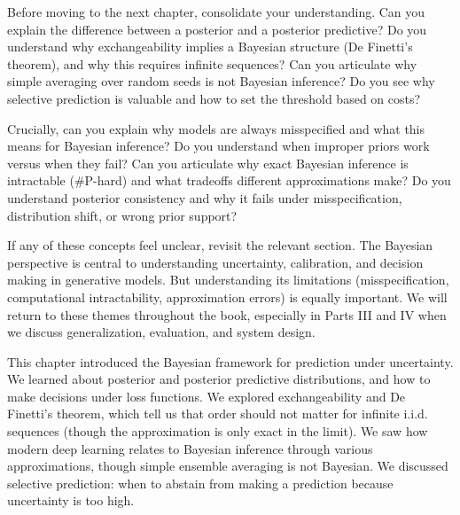 \vspace{2em}


\begin{pausebox}
Before moving to the next chapter, consolidate your understanding. Can you explain the difference between a posterior and a posterior predictive? Do you understand why exchangeability implies a Bayesian structure (De Finetti's theorem), and why this requires infinite sequences? Can you articulate why simple averaging over random seeds is not Bayesian inference? Do you see why selective prediction is valuable and how to set the threshold based on costs?

\vspace{0.5em}

Crucially, can you explain why models are always misspecified and what this means for Bayesian inference? Do you understand when improper priors work versus when they fail? Can you articulate why exact Bayesian inference is intractable (\#P-hard) and what tradeoffs different approximations make? Do you understand posterior consistency and why it fails under misspecification, distribution shift, or wrong prior support?

\vspace{0.5em}

If any of these concepts feel unclear, revisit the relevant section. The Bayesian perspective is central to understanding uncertainty, calibration, and decision making in generative models. But understanding its limitations (misspecification, computational intractability, approximation errors) is equally important. We will return to these themes throughout the book, especially in Parts III and IV when we discuss generalization, evaluation, and system design.
\end{pausebox}

\vspace{1em}

This chapter introduced the Bayesian framework for prediction under uncertainty. We learned about posterior and posterior predictive distributions, and how to make decisions under loss functions. We explored exchangeability and De Finetti's theorem, which tell us that order should not matter for infinite i.i.d. sequences (though the approximation is only exact in the limit). We saw how modern deep learning relates to Bayesian inference through various approximations, though simple ensemble averaging is not Bayesian. We discussed selective prediction: when to abstain from making a prediction because uncertainty is too high.


